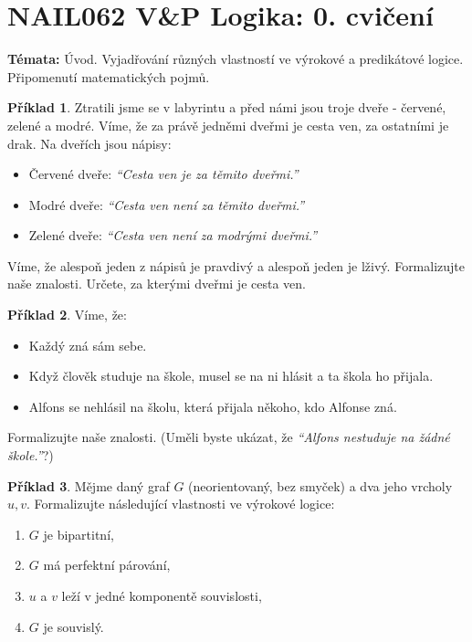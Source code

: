 \documentclass[a4paper]{article}
\theoremstyle{definition}
\newtheorem{problem}{Příklad}
\begin{document}
\section*{NAIL062 V\&P Logika: 0. cvičení}


\textbf{Témata:} Úvod. Vyjadřování různých vlastností ve výrokové a predikátové logice. Připomenutí matematických pojmů.


\medskip\begin{problem}
Ztratili jsme se v labyrintu a před námi jsou troje dveře - červené, zelené a modré. Víme, že za právě jedněmi dveřmi je cesta ven, za ostatními je drak. Na dveřích jsou nápisy:
\begin{itemize}
    \item Červené dveře: {\it ``Cesta ven je za těmito dveřmi.''}
    \item Modré dveře: {\it ``Cesta ven není za těmito dveřmi.''}
    \item Zelené dveře: {\it ``Cesta ven není za modrými dveřmi.''}
\end{itemize}
Víme, že alespoň jeden z nápisů je pravdivý a alespoň jeden je lživý. Formalizujte naše znalosti. Určete, za kterými dveřmi je cesta ven.
\end{problem}


\medskip\begin{problem} Víme, že:
\begin{itemize}\it
\item Každý zná sám sebe.
\item Když člověk studuje na škole, musel se na ni hlásit a ta škola ho přijala.
\item Alfons se nehlásil na školu, která přijala někoho, kdo Alfonse zná.
\end{itemize}
Formalizujte naše znalosti. (Uměli byste ukázat, že {\it ``Alfons nestuduje na žádné škole.''}?)
\end{problem}


\medskip\begin{problem}
Mějme daný graf $G$ (neorientovaný, bez smyček) a dva jeho vrcholy $u,v$. Formalizujte následující vlastnosti ve výrokové logice:
\begin{enumerate}
    \item $G$ je bipartitní,
    \item $G$ má perfektní párování,
    \item $u$ a $v$ leží v jedné komponentě souvislosti,
    \item $G$ je souvislý.
\end{enumerate}
\end{problem}
\end{document}
